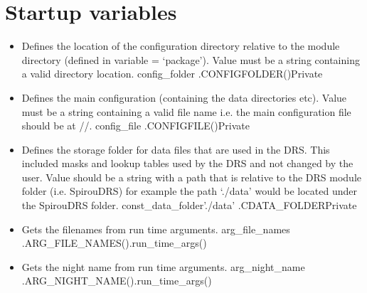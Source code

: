 \section{Startup variables}
\label{ch:variables:startup}

\begin{itemize}


\item {} 
{Defines the location of the configuration directory relative to the module directory (defined in variable = `package'). Value must be a string containing a valid directory location.}
{config\_folder}{\configdirrelpath}
{\AllRecipes}{\spirouConst.CONFIGFOLDER()}{\AllRecipes}{Private}


\item {} 
{Defines the main configuration (containing the data directories etc).  Value must be a string containing a valid file name i.e. the main configuration file should be at //.}
{config\_file}{\configtxtfile}
{\AllRecipes}{\spirouConst.CONFIGFILE()}{\AllRecipes}{Private}


\item {} 
{Defines the storage folder for data files that are used in the DRS. This included masks and lookup tables used by the DRS and not changed by the user. Value should be a string with a path that is relative to the DRS module folder (i.e. SpirouDRS) for example the path `./data' would be located under the SpirouDRS folder.}
{const\_data\_folder}{'./data'}
{\AllRecipes}{\spirouConst.CDATA\_FOLDER}{\AllRecipes}{Private}


\item {} 
{Gets the filenames from run time arguments.}
{arg\_file\_names}
{\AllRecipes}{\spirouConst.ARG\_FILE\_NAMES()}{\spirouStartup.run\_time\_args()}


\item {} 
{Gets the night name from run time arguments.}
{arg\_night\_name}
{\AllRecipes}{\spirouConst.ARG\_NIGHT\_NAME()}{\spirouStartup.run\_time\_args()}



\end{itemize}
